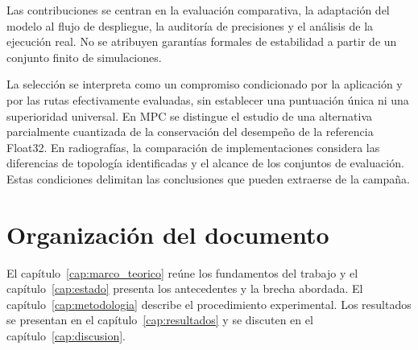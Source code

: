 Las contribuciones se centran en la evaluación comparativa, la adaptación del modelo al flujo de despliegue, la auditoría de precisiones y el análisis de la ejecución real. No se atribuyen garantías formales de estabilidad a partir de un conjunto finito de simulaciones.

La selección se interpreta como un compromiso condicionado por la aplicación y por las rutas efectivamente evaluadas, sin establecer una puntuación única ni una superioridad universal. En MPC se distingue el estudio de una alternativa parcialmente cuantizada de la conservación del desempeño de la referencia Float32. En radiografías, la comparación de implementaciones considera las diferencias de topología identificadas y el alcance de los conjuntos de evaluación. Estas condiciones delimitan las conclusiones que pueden extraerse de la campaña.

\section{Organización del documento}

El capítulo~\ref{cap:marco_teorico} reúne los fundamentos del trabajo y el capítulo~\ref{cap:estado} presenta los antecedentes y la brecha abordada. El capítulo~\ref{cap:metodologia} describe el procedimiento experimental. Los resultados se presentan en el capítulo~\ref{cap:resultados} y se discuten en el capítulo~\ref{cap:discusion}.
